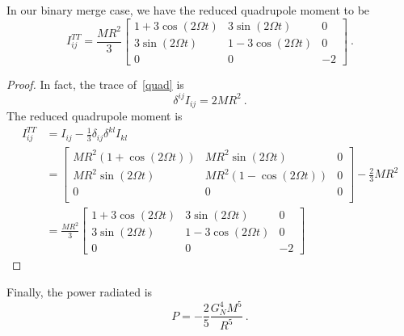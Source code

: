     In our binary merge case, we have the reduced quadrupole moment to be 
    \begin{equation*}
        I^{TT}_{ij} = \frac{M R^2}{3} \begin{bmatrix}
            1 + 3 \cos (2 \Omega t) & 3 \sin (2 \Omega t) & 0 \\
            3 \sin (2 \Omega t) & 1 - 3 \cos(2 \Omega t) & 0 \\
            0 & 0 & -2 
        \end{bmatrix} ~.
    \end{equation*}
    \begin{proof}
        In fact, the trace of~\eqref{quad} is 
        \begin{equation*}
            \delta^{ij} I_{ij} = 2 M R^2 ~.
        \end{equation*}
        The reduced quadrupole moment is 
        \begin{equation*}
        \begin{aligned}
            I^{TT}_{ij} & = I_{ij} - \frac{1}{3} \delta_{ij} \delta^{kl} I_{kl} \\ & = \begin{bmatrix}
                M R^2 (1 + \cos (2 \Omega t)) & M R^2 \sin (2 \Omega t) & 0 \\
                M R^2 \sin (2 \Omega t) & M R^2 (1 - \cos (2 \Omega t)) & 0 \\
                0 & 0 & 0 \\
            \end{bmatrix}  - \frac{2}{3} M R^2 \\ & = \frac{M R^2}{3} \begin{bmatrix}
                1 + 3 \cos (2 \Omega t) & 3 \sin (2 \Omega t) & 0 \\
                3 \sin (2 \Omega t) & 1 - 3 \cos(2 \Omega t) & 0 \\
                0 & 0 & -2 
            \end{bmatrix}
        \end{aligned}
        \end{equation*}
    \end{proof}
    Finally, the power radiated is 
    \begin{equation*}
        P = - \frac{2}{5} \frac{G_N^4 M^5}{R^5} ~.
    \end{equation*}
